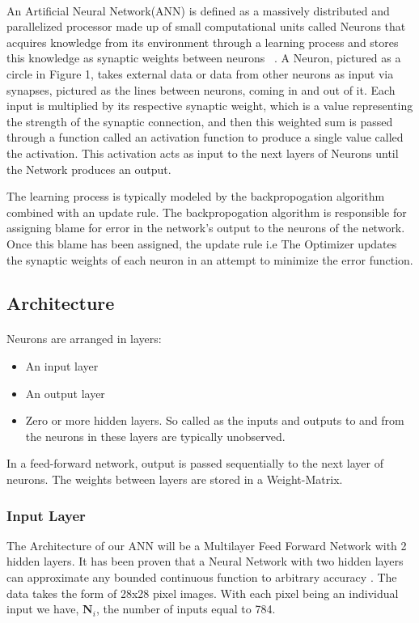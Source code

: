 \documentclass{article}
\begin{document}
\paragraph{}An Artificial Neural Network(ANN) is defined as a massively distributed and parallelized processor made up of small computational units called Neurons that acquires knowledge from its environment through a learning process and stores this knowledge as synaptic weights between neurons ~\cite{ANNDefinition}. A Neuron, pictured as a circle in Figure 1, takes external data or data from other neurons as input via synapses, pictured as the lines between neurons, coming in and out of it. Each input is multiplied by its respective synaptic weight, which is a value representing the strength of the synaptic connection, and then this weighted sum is passed through a function called an activation function to produce a single value called the activation. This activation acts as input to the next layers of Neurons until the Network produces an output.

The learning process is typically modeled by the backpropogation algorithm combined with an update rule. The backpropogation algorithm is responsible for assigning blame for error in the network's output to the neurons of the network. Once this blame has been assigned, the update rule i.e The Optimizer updates the synaptic weights of each neuron in an attempt to minimize the error function.
\subsection{Architecture}
\paragraph{}Neurons are arranged in layers:
\begin{itemize}
	\item An input layer
	\item An output layer
	\item Zero or more hidden layers. So called as the inputs and outputs to and from the neurons in these layers are typically unobserved.
\end{itemize}
In a feed-forward network, output is passed sequentially to the next layer of neurons. The weights between layers are stored in a Weight-Matrix.

\subsubsection{Input Layer}
The Architecture of our ANN will be a Multilayer Feed Forward Network with 2 hidden layers.
It has been proven that a Neural Network with two hidden layers can approximate any bounded continuous function to arbitrary accuracy \cite{Hornik1989}. The data takes the form of 28x28 pixel images. With each pixel being an individual input we have, $\boldsymbol{N}_i$, the number of inputs equal to 784.
\end{document}
